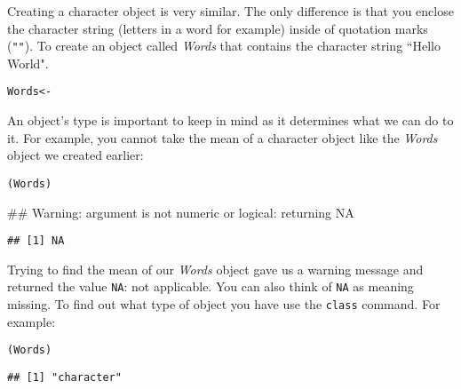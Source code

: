 Creating a character object is very similar. The only difference is that you enclose the character string (letters in a word for example) inside of quotation marks ({\tt{""}}). To create an object called {\emph{Words}} that contains the character string ``Hello World".\label{StringObject}

\begin{knitrout}
\color{fgcolor}\begin{kframe}
\begin{alltt}
Words <- 
\end{alltt}
\end{kframe}
\end{knitrout}



An object's type is important to keep in mind as it determines what we can do to it. For example, you cannot take the mean of a character object like the {\emph{Words}} object we created earlier:

\begin{knitrout}
\color{fgcolor}\begin{kframe}
\begin{alltt}
(Words)
\end{alltt}


{\ttfamily\noindent\textcolor{warningcolor}{\#\# Warning: argument is not numeric or logical: returning NA}}\begin{verbatim}
## [1] NA
\end{verbatim}
\end{kframe}
\end{knitrout}


\noindent Trying to find the mean of our {\emph{Words}} object gave us a warning message and returned the value {\tt{NA}}: not applicable. You can also think of {\tt{NA}} as meaning missing. To find out what type of object you have use the {\tt{class}} command. For example:

\begin{knitrout}
\color{fgcolor}\begin{kframe}
\begin{alltt}
(Words)
\end{alltt}
\begin{verbatim}
## [1] "character"
\end{verbatim}
\end{kframe}
\end{knitrout}


